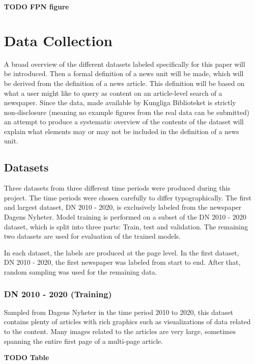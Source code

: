 \documentclass[english, bibtex]{kththesis}
\begin{document}
\textbf{TODO FPN figure}

\chapter{Data Collection}
\label{ch:data}

A broad overview of the different datasets labeled specifically for this paper will be introduced. Then a formal definition of a news unit will be made, which will be derived from the definition of a news article. This definition will be based on what a user might like to query as content on an article-level search of a newspaper. Since the data, made available by Kungliga Biblioteket is strictly non-disclosure (meaning no example figures from the real data can be submitted) an attempt to produce a systematic overview of the contents of the dataset will explain what elements may or may not be included in the definition of a news unit.

\section{Datasets}

Three datasets from three different time periods were produced during this project. The time periods were chosen carefully to differ typographically. The first and largest dataset, DN 2010 - 2020,  is exclusively labeled from the newspaper Dagens Nyheter. Model training is performed on a subset of the DN 2010 - 2020 dataset, which is split into three parts: Train, test and validation. The remaining two datasets are used for evaluation of the trained models.

In each dataset, the labels are produced at the page level. In the first dataset, DN 2010 - 2020, the first newspaper was labeled from start to end. After that, random sampling was used for the remaining data. 


\subsection{DN 2010 - 2020 (Training)}

Sampled from Dagens Nyheter in the time period 2010 to 2020, this dataset contains plenty of articles with rich graphics such as visualizations of data related to the content. Many images related to the articles are very large, sometimes spanning the entire first page of a multi-page article. 

\textbf{TODO Table}
\end{document}
